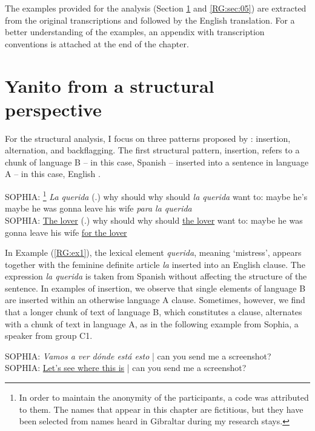 \documentclass[output=paper]{langscibook}
\begin{document}
The examples provided for the analysis (Section \ref{RG:sec:04} and \ref{RG:sec:05}) are extracted from the original transcriptions and followed by the English translation. For a better understanding of the examples, an appendix with transcription conventions is attached at the end of the chapter. 

\section{Yanito from a structural perspective}\label{RG:sec:04}

For the structural analysis, I focus on three patterns proposed by \citet{muysken_language_2013}: insertion, alternation, and backflagging. The first structural pattern, insertion, refers to a chunk of language B – in this case, Spanish – inserted into a sentence in language A – in this case, English \citep[712]{muysken_language_2013}.

\begin{exe}\ex\label{RG:ex1}
SOPHIA: \footnote{In order to maintain the anonymity of the participants, a code was attributed to them. The names that appear in this chapter are fictitious, but they have been selected from names heard in Gibraltar during my research stays.} 
 \textit{La querida} (.) why should why should \textit{la querida} want to: maybe he’s maybe he was gonna leave his wife \textit{para la querida}\\
SOPHIA: \ul{The lover} (.) why should why should \ul{the lover} want to: maybe he was gonna leave his wife \ul{for the lover}
\end{exe}


In Example (\ref{RG:ex1}), the lexical element \textit{querida}, meaning ‘mistress’, appears together with the feminine definite article \textit{la} inserted into an English clause. The expression \textit{la querida} is taken from Spanish without affecting the structure of the sentence. In examples of insertion, we observe that single elements of language B are inserted within an otherwise language A clause. Sometimes, however, we find that a longer chunk of text of language B, which constitutes a clause, alternates with a chunk of text in language A, as in the following example from Sophia, a speaker from group C1.

\begin{exe}\ex\label{RG:ex2}
SOPHIA: \textit{Vamos a ver dónde está esto} | can you send me a screenshot?\\
SOPHIA: \ul{Let’s see where this is} | can you send me a screenshot?
\end{exe}
\end{document}
